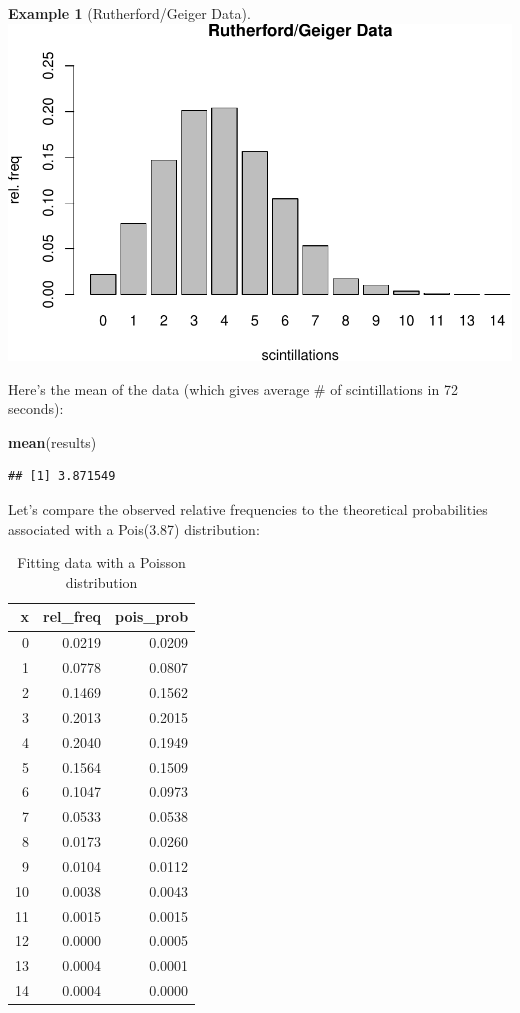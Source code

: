 \documentclass[
]{book}
\newenvironment{Shaded}{\begin{snugshade}}{\end{snugshade}}
\newcommand{\FunctionTok}[1]{\textcolor[rgb]{0.13,0.29,0.53}{\textbf{#1}}}
\newcommand{\NormalTok}[1]{#1}
\theoremstyle{definition}
\theoremstyle{definition}
\newtheorem{example}{Example}[chapter]
\theoremstyle{definition}
\theoremstyle{definition}
\theoremstyle{remark}
\begin{document}
\begin{example}[Rutherford/Geiger Data]
\includegraphics{math340-notes_files/figure-latex/unnamed-chunk-163-1.pdf}

Here's the mean of the data (which gives average \# of scintillations in 72 seconds):

\begin{Shaded}
\begin{Highlighting}[]
\FunctionTok{mean}\NormalTok{(results)}
\end{Highlighting}
\end{Shaded}

\begin{verbatim}
## [1] 3.871549
\end{verbatim}

Let's compare the observed relative frequencies to the theoretical probabilities associated with a Pois(3.87) distribution:

\begin{table}
\centering
\caption{\label{tab:unnamed-chunk-165}Fitting data with a Poisson distribution}
\centering
\begin{tabular}[t]{r|r|r}
\hline
x & rel\_freq & pois\_prob\\
\hline
0 & 0.0219 & 0.0209\\
\hline
1 & 0.0778 & 0.0807\\
\hline
2 & 0.1469 & 0.1562\\
\hline
3 & 0.2013 & 0.2015\\
\hline
4 & 0.2040 & 0.1949\\
\hline
5 & 0.1564 & 0.1509\\
\hline
6 & 0.1047 & 0.0973\\
\hline
7 & 0.0533 & 0.0538\\
\hline
8 & 0.0173 & 0.0260\\
\hline
9 & 0.0104 & 0.0112\\
\hline
10 & 0.0038 & 0.0043\\
\hline
11 & 0.0015 & 0.0015\\
\hline
12 & 0.0000 & 0.0005\\
\hline
13 & 0.0004 & 0.0001\\
\hline
14 & 0.0004 & 0.0000\\
\hline
\end{tabular}
\end{table}


\end{example}
\end{document}
